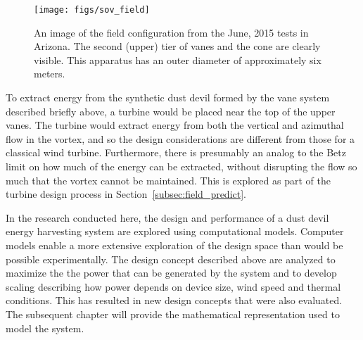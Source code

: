   \begin{figure}[!htb]
    \begin{center}
     \texttt{[image: figs/sov\_field]}
     \caption{An image of the field configuration from the June, 2015
     tests in Arizona. The second (upper) tier of vanes and the cone are
     clearly visible. This apparatus has an outer diameter of
     approximately six meters.}
     \label{fig:field_test}
    \end{center}
  \end{figure}

To extract energy from the synthetic dust devil formed by the vane
system described briefly above, a turbine would be placed near the top
of the upper vanes. The turbine would extract energy from both the
vertical and azimuthal flow in the vortex, and so the design
considerations are different from those for a classical wind turbine.
Furthermore, there is presumably an analog to the Betz limit on how
much of the energy can be extracted, without disrupting the flow so
much that the vortex cannot be maintained. This is explored as part of
the turbine design process in Section~\ref{subsec:field_predict}. 

In the research conducted here, the design and performance of a dust
devil energy harvesting system are explored using computational
models. Computer models enable a more extensive exploration of
the design space than would be possible experimentally. The design
concept described above are analyzed to maximize the the
power that can be generated by the system and to develop scaling
describing how power depends on device size, wind speed and thermal
conditions. This has resulted in new design concepts that were also 
evaluated. The subsequent chapter will provide the mathematical
representation used to model the system.  

%
%
%


